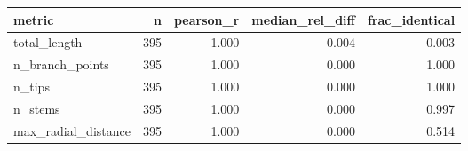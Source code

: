 \begin{tabular}{lrrrr}
\toprule
metric & n & pearson_r & median_rel_diff & frac_identical \\
\midrule
total_length & 395 & 1.000 & 0.004 & 0.003 \\
n_branch_points & 395 & 1.000 & 0.000 & 1.000 \\
n_tips & 395 & 1.000 & 0.000 & 1.000 \\
n_stems & 395 & 1.000 & 0.000 & 0.997 \\
max_radial_distance & 395 & 1.000 & 0.000 & 0.514 \\
\bottomrule
\end{tabular}
